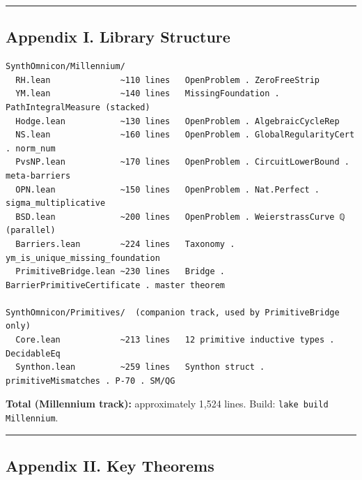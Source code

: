 \documentclass[12pt,a4paper]{article}
\begin{document}
\begin{center}
\rule{0.5\textwidth}{0.4pt}
\end{center}

\subsection{Appendix I. Library Structure}

\begin{lstlisting}
SynthOmnicon/Millennium/
  RH.lean              ~110 lines   OpenProblem . ZeroFreeStrip
  YM.lean              ~140 lines   MissingFoundation . PathIntegralMeasure (stacked)
  Hodge.lean           ~130 lines   OpenProblem . AlgebraicCycleRep
  NS.lean              ~160 lines   OpenProblem . GlobalRegularityCert . norm_num
  PvsNP.lean           ~170 lines   OpenProblem . CircuitLowerBound . meta-barriers
  OPN.lean             ~150 lines   OpenProblem . Nat.Perfect . sigma_multiplicative
  BSD.lean             ~200 lines   OpenProblem . WeierstrassCurve ℚ (parallel)
  Barriers.lean        ~224 lines   Taxonomy . ym_is_unique_missing_foundation
  PrimitiveBridge.lean ~230 lines   Bridge . BarrierPrimitiveCertificate . master theorem

SynthOmnicon/Primitives/  (companion track, used by PrimitiveBridge only)
  Core.lean            ~213 lines   12 primitive inductive types . DecidableEq
  Synthon.lean         ~259 lines   Synthon struct . primitiveMismatches . P-70 . SM/QG
\end{lstlisting}

\textbf{Total (Millennium track):} approximately 1,524 lines. Build: \texttt{lake build Millennium}.

\begin{center}
\rule{0.5\textwidth}{0.4pt}
\end{center}

\subsection{Appendix II. Key Theorems}
\end{document}
